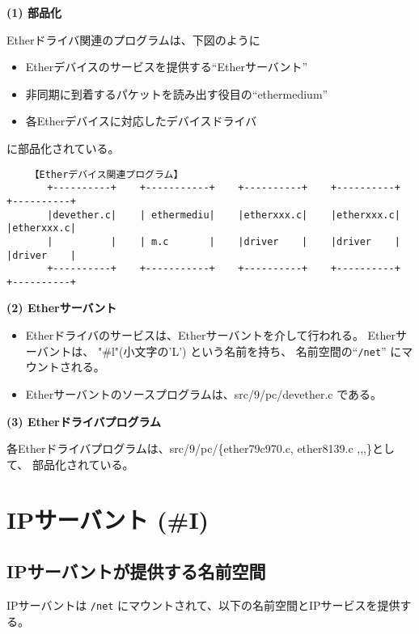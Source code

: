 {\bf \flushleft(1) 部品化}

Etherドライバ関連のプログラムは、下図のように
\begin{itemize}
\item   Etherデバイスのサービスを提供する``Etherサーバント''
\item   非同期に到着するパケットを読み出す役目の``ethermedium''
\item   各Etherデバイスに対応したデバイスドライバ
\end{itemize}
に部品化されている。

{\small
\begin{verbatim}  
    【Etherデバイス関連プログラム】
       +----------+    +-----------+    +----------+    +----------+    +----------+ 
       |devether.c|    | ethermediu|    |etherxxx.c|    |etherxxx.c|    |etherxxx.c| 
       |          |    | m.c       |    |driver    |    |driver    |    |driver    | 
       +----------+    +-----------+    +----------+    +----------+    +----------+ 
\end{verbatim}
}
    

{\bf \flushleft(2) Etherサーバント}

\begin{itemize}
\item    Etherドライバのサービスは、Etherサーバントを介して行われる。
         Etherサーバントは、 "\#l"(小文字の'L') という名前を持ち、
         名前空間の``\verb|/net|'' にマウントされる。 

\item   Etherサーバントのソースプログラムは、src/9/pc/devether.c である。

\end{itemize}



{\bf \flushleft(3) Etherドライバプログラム}

 各Etherドライバプログラムは、src/9/pc/\{ether79c970.c, ether8139.c ,,,\}として、
部品化されている。



\chapter{IPサーバント (\#I)}

\section{IPサーバントが提供する名前空間}

   IPサーバントは \verb|/net| にマウントされて、以下の名前空間とIPサービスを提供する。

